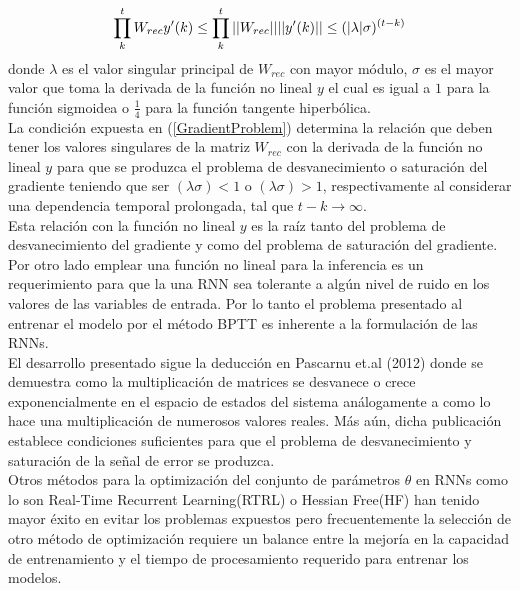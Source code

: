 \documentclass{article}
\begin{document}
	\begin{equation}\label{GradientProblem}
	\prod_{k}^{t} W_{rec} y'(k) \leq \prod_{k}^{t} ||W_{rec}|| \space ||y'(k)|| \leq (|\lambda| \sigma)^{(t-k)}
	\end{equation}
	donde $\lambda$ es el valor singular principal de $W_{rec}$ con mayor módulo, $\sigma$ es el mayor valor que toma la derivada de la función no lineal $y$ el cual es igual a $1$ para la función sigmoidea o $\frac{1}{4}$ para la función tangente hiperbólica.\\
	La condición expuesta en (\ref{GradientProblem}) determina la relación que deben tener los valores singulares de la matriz $W_{rec}$ con la derivada de la función no lineal $y$ para que se produzca el problema de desvanecimiento o saturación del gradiente teniendo que ser $(\lambda \sigma) < 1$ o  $(\lambda \sigma) > 1$, respectivamente al considerar una dependencia temporal prolongada, tal que $t-k \rightarrow \infty$.\\
	Esta relación con la función no lineal $y$ es la raíz tanto del problema de desvanecimiento del gradiente y como del problema de saturación del gradiente. \\
	Por otro lado emplear una función no lineal para la inferencia es un requerimiento para que la una RNN sea tolerante a algún nivel de ruido en los valores de las variables de entrada\cite{24LongTermDependenciesBengio}. Por lo tanto el problema presentado al entrenar el modelo por el método BPTT es inherente a la formulación de las RNNs.\\
	
	El desarrollo presentado sigue la deducción en Pascarnu et.al (2012)\cite{10Pascanu} donde se demuestra como la multiplicación de matrices se desvanece o crece exponencialmente en el espacio de estados del sistema análogamente a como lo hace una multiplicación de numerosos valores reales. Más aún, dicha publicación establece condiciones suficientes para que el problema de desvanecimiento y saturación de la señal de error se produzca.\\
	
	Otros métodos para la optimización del conjunto de parámetros $\theta$ en RNNs como lo son Real-Time Recurrent Learning(RTRL) o Hessian Free(HF)\cite{20SutskeverPhdThesis} han tenido mayor éxito en evitar los problemas expuestos pero frecuentemente la selección de otro método de optimización requiere un balance entre la mejoría en la capacidad de entrenamiento y el tiempo de procesamiento requerido para entrenar los modelos.
	
\end{document}
